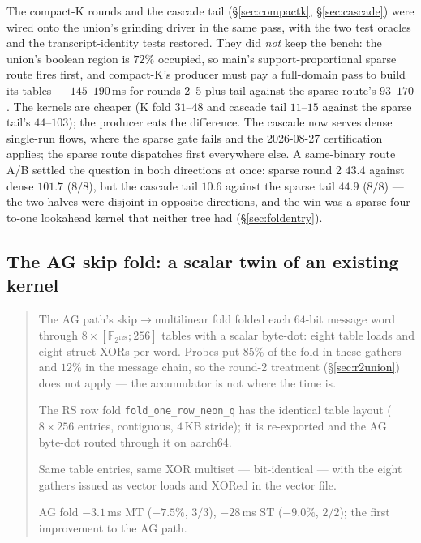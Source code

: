 \documentclass[11pt]{article}
\newcommand{\Fbig}{\mathbb{F}_{2^{128}}}
\newcommand{\code}[1]{\texttt{#1}}
\newenvironment{optsummary}{%
  \begin{quote}\small
  \begin{description}
  \setlength{\itemsep}{1pt}\setlength{\parsep}{0pt}\setlength{\topsep}{2pt}
}{%
  \end{description}
  \end{quote}
}
\begin{document}
The compact-K rounds and the cascade tail (\S\ref{sec:compactk},
\S\ref{sec:cascade}) were wired onto the union's grinding driver in the
same pass, with the two test oracles and the transcript-identity tests
restored. They did \emph{not} keep the bench: the union's boolean region
is $72\%$ occupied, so main's support-proportional sparse route fires
first, and compact-K's producer must pay a full-domain pass to build
its tables --- $145$--$190\,$ms for rounds 2--5 plus tail against the
sparse route's $93$--$170$. The kernels are cheaper (K fold $31$--$48$
and cascade tail $11$--$15$ against the sparse tail's $44$--$103$); the
producer eats the difference. The cascade now serves dense single-run
flows, where the sparse gate fails and the 2026-08-27 certification
applies; the sparse route dispatches first everywhere else. A same-binary
route A/B settled the question in both directions at once: sparse
round 2 $43.4$ against dense $101.7$ ($8/8$), but the cascade tail
$10.6$ against the sparse tail $44.9$ ($8/8$) --- the two halves were
disjoint in opposite directions, and the win was a sparse
four-to-one lookahead kernel that neither tree had
(\S\ref{sec:foldentry}).

\subsection{The AG skip fold: a scalar twin of an existing kernel}\label{sec:agfold}

\begin{optsummary}
\item[Baseline:] The AG path's skip$\to$multilinear fold folded each $64$-bit message word through $8\times[\Fbig;256]$ tables with a scalar byte-dot: eight table loads and eight struct XORs per word. Probes put $85\%$ of the fold in these gathers and $12\%$ in the message chain, so the round-2 treatment (\S\ref{sec:r2union}) does not apply --- the accumulator is not where the time is.
\item[Improvement:] The RS row fold \code{fold\_one\_row\_neon\_q} has the identical table layout ($8\times256$ entries, contiguous, $4\,$KB stride); it is re-exported and the AG byte-dot routed through it on aarch64.
\item[Mechanism:] Same table entries, same XOR multiset --- bit-identical --- with the eight gathers issued as vector loads and XORed in the vector file.
\item[Result:] AG fold $-3.1\,$ms MT ($-7.5\%$, $3/3$), $-28\,$ms ST ($-9.0\%$, $2/2$); the first improvement to the AG path.
\end{optsummary}
\end{document}
